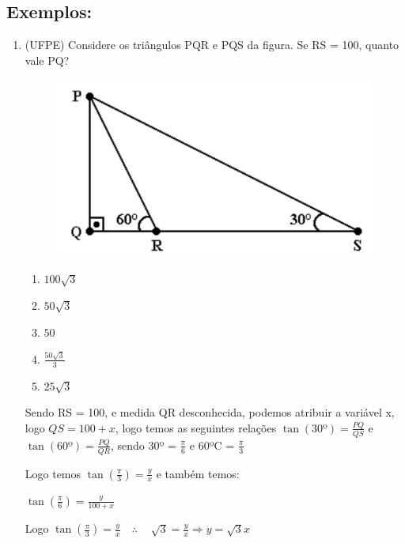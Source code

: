 \begin{multicols*}{2}
    \subsection*{Exemplos:}
    \begin{enumerate}[wide, labelwidth=!, labelindent=0pt]
        \item(UFPE) Considere os triângulos PQR e PQS da figura. Se RS = 100, quanto vale PQ?

              \begin{figure}[H]
                  \centering
                  \includegraphics[scale=0.38]{assets/rafael/img39.png}
              \end{figure}
              \begin{enumerate}
                  \item $100 \sqrt{3}$
                  \item $50 \sqrt{3} $
                  \item $ 50$
                  \item $\frac{50 \sqrt{3}}{3}$
                  \item $25 \sqrt{3}$
              \end{enumerate}
              Sendo RS = 100, e medida QR desconhecida, podemos atribuir a variável x, logo $QS = 100 + x$, logo temos as seguintes relações $\tan(30º) = \frac{PQ}{QS}$ e $\tan(60º) = \frac{PQ}{QR}$, sendo 30º = $\frac{\pi}{6}$ e 60ºC = $\frac{\pi}{3}$

              Logo temos $\tan \left( \frac{\pi}{3} \right) = \frac{y}{x}$ e também temos:

              $\tan \left( \frac{\pi}{6} \right) = \frac{y}{100 +x}$

              Logo $\tan \left( \frac{\pi}{3} \right) = \frac{y}{x} \quad \therefore \quad\ \sqrt{3} = \frac{y}{x} \Rightarrow y = \sqrt{3}x$


\end{enumerate}
\end{multicols*}
